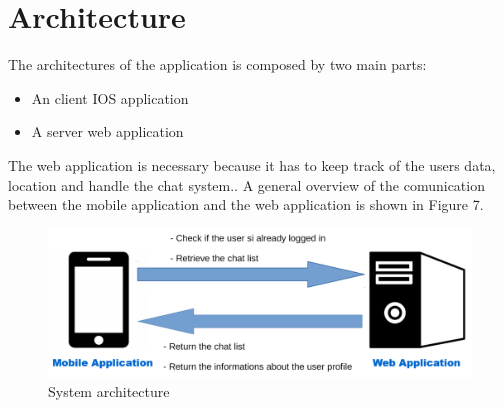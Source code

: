 \section{Architecture}
The architectures of the application is composed by two main parts:
\begin{itemize}
\item An client IOS application
\item A server web application
\end{itemize}
The web application is necessary because it has to keep track of the users data, location and handle the chat system.. A general overview of the comunication between the mobile application and the web application is shown in Figure 7.

\begin{figure}[H]
\centering
\includegraphics[width=1\textwidth]{./images/architecture.png}
\caption{System architecture}
\label{architecture}
\end{figure}